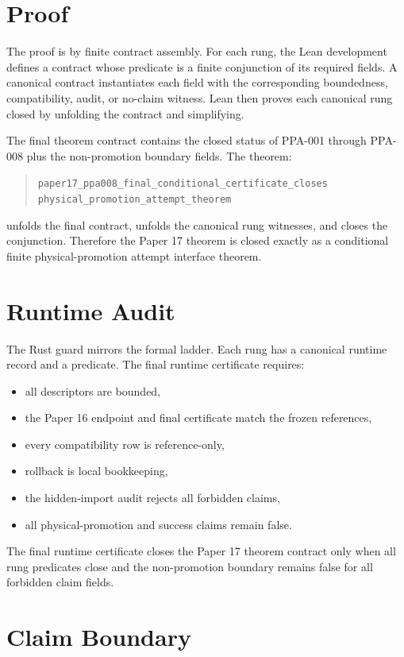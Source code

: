 \documentclass{article}
\begin{document}
\section{Proof}

The proof is by finite contract assembly. For each rung, the Lean development
defines a contract whose  predicate is a finite conjunction of
its required fields. A canonical contract instantiates each field with the
corresponding boundedness, compatibility, audit, or no-claim witness. Lean then
proves each canonical rung closed by unfolding the contract and simplifying.

The final theorem contract contains the closed status of PPA-001 through
PPA-008 plus the non-promotion boundary fields. The theorem:
\begin{quote}
\texttt{paper17\_ppa008\_final\_conditional\_certificate\_closes}\\
\texttt{physical\_promotion\_attempt\_theorem}
\end{quote}
unfolds the final contract, unfolds the canonical rung witnesses, and closes
the conjunction. Therefore the Paper 17 theorem is closed exactly as a
conditional finite physical-promotion attempt interface theorem.

\section{Runtime Audit}

The Rust guard mirrors the formal ladder. Each rung has a canonical runtime
record and a  predicate. The final runtime certificate
requires:
\begin{itemize}
\item all descriptors are bounded,
\item the Paper 16 endpoint and final certificate match the frozen references,
\item every compatibility row is reference-only,
\item rollback is local bookkeeping,
\item the hidden-import audit rejects all forbidden claims,
\item all physical-promotion and success claims remain false.
\end{itemize}
The final runtime certificate closes the Paper 17 theorem contract only when
all rung predicates close and the non-promotion boundary remains false for all
forbidden claim fields.

\section{Claim Boundary}
\end{document}
